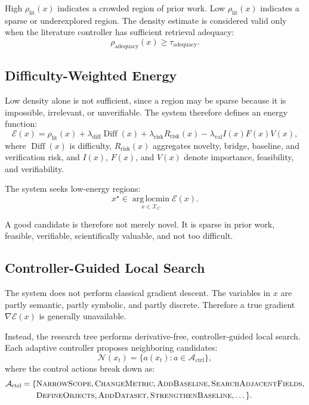 \documentclass[11pt]{article}
\begin{document}
High $\rho_{\mathrm{lit}}(x)$ indicates a crowded region of prior work. Low $\rho_{\mathrm{lit}}(x)$ indicates a sparse or underexplored region. The density estimate is considered valid only when the literature controller has sufficient retrieval adequacy:
$$ \rho_{\mathrm{adequacy}}(x)\geq \tau_{\mathrm{adequacy}}. $$

\subsection{Difficulty-Weighted Energy}
Low density alone is not sufficient, since a region may be sparse because it is impossible, irrelevant, or unverifiable. The system therefore defines an energy function:
$$ \mathcal{E}(x) = \rho_{\mathrm{lit}}(x) + \lambda_{\mathrm{diff}}\operatorname{Diff}(x) + \lambda_{\mathrm{risk}}R_{\mathrm{risk}}(x) - \lambda_{\mathrm{val}}I(x)F(x)V(x), $$
where $\operatorname{Diff}(x)$ is difficulty, $R_{\mathrm{risk}}(x)$ aggregates novelty, bridge, baseline, and verification risk, and $I(x)$, $F(x)$, and $V(x)$ denote importance, feasibility, and verifiability.

The system seeks low-energy regions:
$$ x^\star \in \operatorname*{arg\,locmin}_{x\in\mathcal{X}_C} \mathcal{E}(x). $$

A good candidate is therefore not merely novel. It is sparse in prior work, feasible, verifiable, scientifically valuable, and not too difficult.

\subsection{Controller-Guided Local Search}
The system does not perform classical gradient descent. The variables in $x$ are partly semantic, partly symbolic, and partly discrete. Therefore a true gradient $\nabla \mathcal{E}(x)$ is generally unavailable.

Instead, the research tree performs derivative-free, controller-guided local search. Each adaptive controller proposes neighboring candidates:
$$ \mathcal{N}(x_t) = \{a(x_t):a\in\mathcal{A}_{\mathrm{ctrl}}\}, $$
where the control actions break down as:
$$ 
\begin{aligned}
\mathcal{A}_{\mathrm{ctrl}} = \{ &\textsc{NarrowScope}, \textsc{ChangeMetric}, \textsc{AddBaseline}, \textsc{SearchAdjacentFields}, \\
&\textsc{DefineObjects}, \textsc{AddDataset}, \textsc{StrengthenBaseline}, \dots \}.
\end{aligned}
$$
\end{document}
